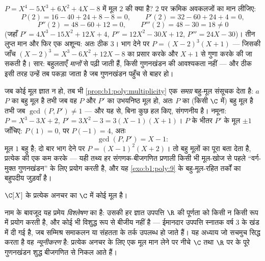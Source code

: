 \begin{example}[बहुलता की संगणना]\label{ex:b1:poly:multexample}
$P = X^4 - 5X^3 + 6X^2 + 4X - 8$ में मूल $2$ की  क्या है? $2$ पर
क्रमिक अवकलजों का मान लीजिए:
\[
P(2) = 16 - 40 + 24 + 8 - 8 = 0, \qquad
P'(2) = 32 - 60 + 24 + 4 = 0,
\]
\[
P''(2) = 48 - 60 + 12 = 0, \qquad
P'''(2) = 48 - 30 = 18 \neq 0
\]
(जहाँ $P' = 4X^3 - 15X^2 + 12X + 4$, $P'' = 12X^2 - 30X + 12$, $P''' = 24X -
30$)। तीन लुप्त मान और फिर एक अशून्य: अतः  ठीक $3$। भाग देने पर $P =
(X - 2)^3(X + 1)$ --- जिसकी जाँच $(X-2)^3 = X^3 - 6X^2 + 12X - 8$ का प्रसार
करके और $X + 1$ से गुणा करके की जा सकती है। सार: बहुलताएँ \emph{मानों} से
पढ़ी जाती हैं, किसी गुणनखंडन की आवश्यकता नहीं --- और ठीक इसी तरह उन्हें तब
पकड़ा जाता है जब गुणनखंडन पहुँच से बाहर हो।
\end{example}

\begin{example}\label{ex:b1:poly:gcdmultiple}
जब कोई मूल ज्ञात न हो, तब भी \cref{prop:b1:poly:multiplicity} एक
\emph{समग्र} बहु-मूल संसूचक देता है: $a$ $P$ का बहु मूल है तभी जब वह $P$ और
$P'$ का उभयनिष्ठ मूल हो, अतः $P$ का (किसी $\C$ में) बहु मूल है तभी जब
$\gcd(P, P') \neq 1$ --- और यह  से, बिना कुछ हल किए,
संगणनीय है। नमूना: $P = X^3 - 3X + 2$, $P' = 3X^2 - 3 = 3(X - 1)(X + 1)$।
$P$ के भीतर $P'$ के मूल $\pm1$ जाँचिए: $P(1) = 0$, पर $P(-1) = 4$, अतः
\[
\gcd(P, P') = X - 1 :
\]
मूल $1$ बहु है; दो बार भाग देने पर $P = (X - 1)^2(X + 2)$। 
तो बहु मूलों का पूरा  बता देता है, प्रत्येक की  एक कम करके ---
यही तथ्य हर संगणक-बीजगणित प्रणाली किसी भी मूल-खोज से पहले ``वर्ग-मुक्त
गुणनखंडन'' के लिए प्रयोग करती है, और यह \cref{exo:b1:poly:9} के बहु-मूल-रहित
तर्कों का बहुपदीय जुड़वाँ है।
\end{example}

\begin{theorem}[बीजगणित की मूल प्रमेय]\label{thm:b1:poly:fta}
$\C[X]$ के प्रत्येक अनचर  का $\C$ में कोई मूल है।
\end{theorem}
\admitted

\begin{remark}
नाम के बावजूद यह प्रमेय \emph{विश्लेषण} का  है: उसकी हर ज्ञात उपपत्ति
$\R$ की पूर्णता को किसी न किसी रूप में प्रयोग करती है, और कोई भी विशुद्ध रूप
से बीजीय नहीं है --- ईमानदार उपपत्ति स्नातक वर्ष 3 के खंड में दी गई है, जब
सम्मिश्र समाकलन या संहतता के तर्क उपलब्ध हो जाते हैं। यह अध्याय जो सचमुच
सिद्ध करता है वह \emph{न्यूनीकरण} है: प्रत्येक अनचर  के लिए एक मूल मान
लेने पर नीचे $\C$ तथा $\R$ पर के पूरे गुणनखंडन शुद्ध बीजगणित से निकल आते
हैं।
\end{remark}

